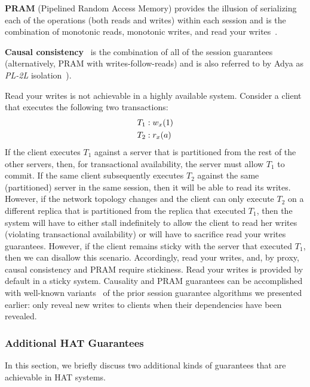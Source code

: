 \vspace{.5em}\noindent\textbf{{PRAM}} (Pipelined Random Access Memory)
provides the illusion of serializing each of the operations (both
reads and writes) within each session and is the combination of
monotonic reads, monotonic writes, and read your
writes~\cite{herlihy-art}.

\vspace{.5em}\noindent\textbf{{Causal
    consistency}}~\cite{causalmemory} is the combination of all of the
session guarantees~\cite{sessiontocausal} (alternatively, PRAM with
writes-follow-reads) and is also referred to by Adya as \textit{PL-2L}
isolation~\cite{adya}).\vspace{.5em}

Read your writes is not achievable in a highly available
system. Consider a client that executes the following two transactions:
\begin{align*}
\small
T_1 &: w_x(1)
\\T_2 &: r_x(a)
\end{align*}
If the client executes $T_1$ against a server that is partitioned from
the rest of the other servers, then, for transactional availability,
the server must allow $T_1$ to commit. If the same client subsequently
executes $T_2$ against the same (partitioned) server in the same
session, then it will be able to read its writes. However, if the
network topology changes and the client can only execute $T_2$ on a
different replica that is partitioned from the replica that executed
$T_1$, then the system will have to either stall indefinitely to allow
the client to read her writes (violating transactional availability)
or will have to sacrifice read your writes guarantees. However, if the
client remains sticky with the server that executed $T_1$, then we can
disallow this scenario. Accordingly, read your writes, and, by proxy,
causal consistency and PRAM require stickiness. Read your writes is
provided by default in a sticky system. Causality and PRAM guarantees
can be accomplished with well-known variants~\cite{causalmemory,
  bolton, eiger, sessionguarantees, swift} of the prior session
guarantee algorithms we presented earlier: only reveal new writes to
clients when their dependencies have been revealed.

\subsubsection{Additional HAT Guarantees}

In this section, we briefly discuss two additional kinds of guarantees
that are achievable in HAT systems.

